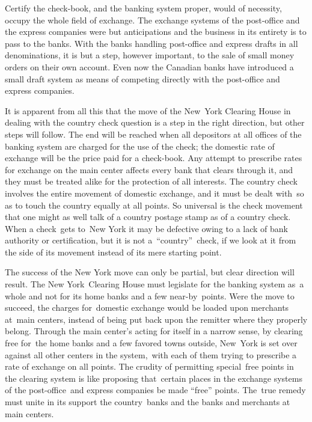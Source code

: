 \documentclass[twoside,symmetric,nobib,justified]{tufte-book}
\begin{document}
Certify the check-book, and the banking system proper, would of
necessity, occupy the whole field of exchange. The exchange systems of
the post-office and the express companies were but anticipations and the
business in its entirety is to pass to the banks. With the banks
handling post-office and express drafts in all denominations, it is but
a step, however important, to the sale of small money orders on their
own account. Even now the Canadian banks have introduced a small draft
system as means of competing directly with the post-office and express
companies.~

It is apparent from all this that the move of the New~York Clearing
House in dealing with the country check question is a step in the right
direction, but other steps will follow. The end will be reached when all
depositors at all offices of the banking system are charged for the use
of the check; the domestic rate of exchange will be the price paid for a
check-book. Any attempt to prescribe rates for exchange on the main
center affects every bank that clears through it, and they must be
treated alike for the protection of all interests. The country check
involves the entire movement of domestic exchange, and it must be dealt
with~so as to touch the country equally at all points. So universal is
the check movement that one might as well talk of a country postage
stamp as of a country check. When a check~gets to~New York it may be
defective owing to a lack of bank authority or certification, but it is
not a~``country''~check, if we look at it from the side of its movement
instead of its mere starting point.~

The success of the New York move can only be partial, but clear
direction will result. The New York~Clearing House must legislate for
the banking system as~a whole and not for its home banks and a few
near-by~points. Were the move to succeed, the charges for~domestic
exchange would be loaded upon merchants at~main centers, instead of
being put back upon the remitter where they properly belong. Through the
main center's acting for itself in a narrow sense, by clearing free
for~the home banks and a few favored towns outside, New~York is set over
against all other centers in the system,~with each of them trying to
prescribe a rate of exchange on all points. The crudity of permitting
special~free points in the clearing system is like proposing
that~certain places in the exchange systems of the post-office~and
express companies be made ``free'' points. The~true remedy must unite in
its support the country~banks and the banks and merchants at main
centers.~
\end{document}

